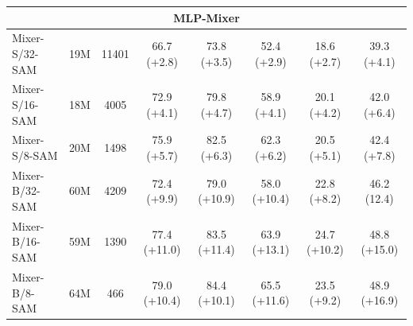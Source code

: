 \documentclass{article}
\begin{document}
\begin{table}
{\begin{tabular}{l|cc|ccc|cc}
    \multicolumn{8}{c}{\textbf{MLP-Mixer}} \\ \midrule 
    Mixer-S/32-SAM & 19M & 11401 & 66.7 (+2.8) & 73.8 (+3.5) & 52.4 (+2.9) & 18.6 (+2.7) & 39.3 (+4.1) \\ 
    Mixer-S/16-SAM & 18M & 4005 & 72.9 (+4.1) & 79.8 (+4.7) & 58.9 (+4.1) & 20.1 (+4.2) & 42.0 (+6.4) \\ 
    Mixer-S/8-SAM & 20M & 1498 & 75.9 (+5.7) & 82.5 (+6.3) & 62.3 (+6.2) & 20.5 (+5.1) & 42.4 (+7.8) \\ 
    
    Mixer-B/32-SAM & 60M & 4209 & 72.4 (+9.9) & 79.0 (+10.9) & 58.0 (+10.4) & 22.8 (+8.2) & 46.2 (12.4) \\ 
    Mixer-B/16-SAM & 59M & 1390 & 77.4 (+11.0) & 83.5 (+11.4) & 63.9 (+13.1) & 24.7 (+10.2) & 48.8 (+15.0) \\ 
    Mixer-B/8-SAM & 64M & 466 & 79.0 (+10.4) & 84.4 (+10.1) & 65.5 (+11.6) & 23.5 (+9.2) & 48.9 (+16.9) \\
    
    \bottomrule
    
    \end{tabular}}
    \vspace{-15pt}
\end{table}
\end{document}
